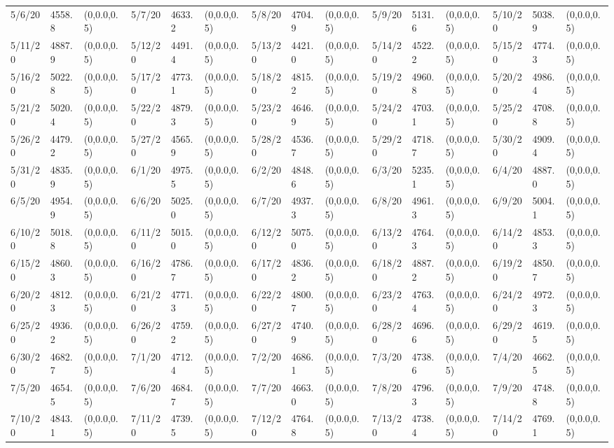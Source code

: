 \documentclass[12pt]{article}
\begin{document}
\begin{table}
\begin{center}
\begin{tabular}{p{15pt}p{15pt}p{25pt}p{15pt}p{15pt}p{25pt}p{15pt}p{15pt}p{25pt}p{15pt}p{15pt}p{25pt}p{15pt}p{15pt}p{25pt}}
            5/6/20&4558.8&(0,0.0,0.5)&5/7/20&4633.2&(0,0.0,0.5)&5/8/20&4704.9&(0,0.0,0.5)&5/9/20&5131.6&(0,0.0,0.5)&5/10/20&5038.9&(0,0.0,0.5)\\
            5/11/20&4887.9&(0,0.0,0.5)&5/12/20&4491.4&(0,0.0,0.5)&5/13/20&4421.0&(0,0.0,0.5)&5/14/20&4522.2&(0,0.0,0.5)&5/15/20&4774.3&(0,0.0,0.5)\\
            5/16/20&5022.8&(0,0.0,0.5)&5/17/20&4773.1&(0,0.0,0.5)&5/18/20&4815.2&(0,0.0,0.5)&5/19/20&4960.8&(0,0.0,0.5)&5/20/20&4986.4&(0,0.0,0.5)\\
            5/21/20&5020.4&(0,0.0,0.5)&5/22/20&4879.3&(0,0.0,0.5)&5/23/20&4646.9&(0,0.0,0.5)&5/24/20&4703.1&(0,0.0,0.5)&5/25/20&4708.8&(0,0.0,0.5)\\
            5/26/20&4479.2&(0,0.0,0.5)&5/27/20&4565.9&(0,0.0,0.5)&5/28/20&4536.7&(0,0.0,0.5)&5/29/20&4718.7&(0,0.0,0.5)&5/30/20&4909.4&(0,0.0,0.5)\\
            5/31/20&4835.9&(0,0.0,0.5)&6/1/20&4975.5&(0,0.0,0.5)&6/2/20&4848.6&(0,0.0,0.5)&6/3/20&5235.1&(0,0.0,0.5)&6/4/20&4887.0&(0,0.0,0.5)\\
            6/5/20&4954.9&(0,0.0,0.5)&6/6/20&5025.0&(0,0.0,0.5)&6/7/20&4937.3&(0,0.0,0.5)&6/8/20&4961.3&(0,0.0,0.5)&6/9/20&5004.1&(0,0.0,0.5)\\
            6/10/20&5018.8&(0,0.0,0.5)&6/11/20&5015.0&(0,0.0,0.5)&6/12/20&5075.0&(0,0.0,0.5)&6/13/20&4764.3&(0,0.0,0.5)&6/14/20&4853.3&(0,0.0,0.5)\\
            6/15/20&4860.3&(0,0.0,0.5)&6/16/20&4786.7&(0,0.0,0.5)&6/17/20&4836.2&(0,0.0,0.5)&6/18/20&4887.2&(0,0.0,0.5)&6/19/20&4850.7&(0,0.0,0.5)\\
            6/20/20&4812.3&(0,0.0,0.5)&6/21/20&4771.3&(0,0.0,0.5)&6/22/20&4800.7&(0,0.0,0.5)&6/23/20&4763.4&(0,0.0,0.5)&6/24/20&4972.3&(0,0.0,0.5)\\
            6/25/20&4936.2&(0,0.0,0.5)&6/26/20&4759.2&(0,0.0,0.5)&6/27/20&4740.9&(0,0.0,0.5)&6/28/20&4696.6&(0,0.0,0.5)&6/29/20&4619.5&(0,0.0,0.5)\\
            6/30/20&4682.7&(0,0.0,0.5)&7/1/20&4712.4&(0,0.0,0.5)&7/2/20&4686.1&(0,0.0,0.5)&7/3/20&4738.6&(0,0.0,0.5)&7/4/20&4662.5&(0,0.0,0.5)\\
            7/5/20&4654.5&(0,0.0,0.5)&7/6/20&4684.7&(0,0.0,0.5)&7/7/20&4663.0&(0,0.0,0.5)&7/8/20&4796.3&(0,0.0,0.5)&7/9/20&4748.8&(0,0.0,0.5)\\
            7/10/20&4843.1&(0,0.0,0.5)&7/11/20&4739.5&(0,0.0,0.5)&7/12/20&4764.8&(0,0.0,0.5)&7/13/20&4738.4&(0,0.0,0.5)&7/14/20&4769.1&(0,0.0,0.5)\\

\end{tabular}
\end{center}
\end{table}
\end{document}
